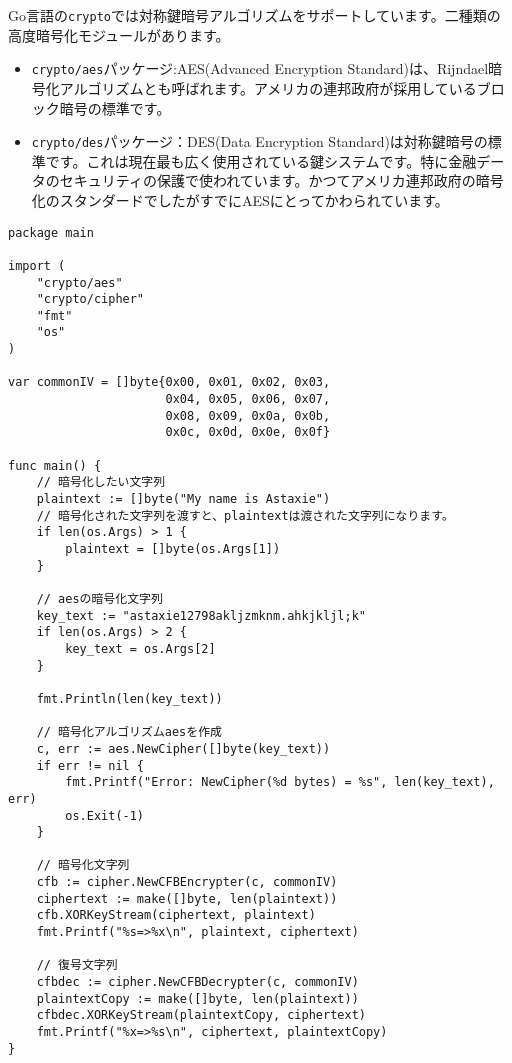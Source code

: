 Go言語の\texttt{crypto}では対称鍵暗号アルゴリズムをサポートしています。二種類の高度暗号化モジュールがあります。

\begin{itemize}
  \item \texttt{crypto/aes}パッケージ:AES(Advanced Encryption Standard)は、Rijndael暗号化アルゴリズムとも呼ばれます。アメリカの連邦政府が採用しているブロック暗号の標準です。
  \item \texttt{crypto/des}パッケージ：DES(Data Encryption Standard)は対称鍵暗号の標準です。これは現在最も広く使用されている鍵システムです。特に金融データのセキュリティの保護で使われています。かつてアメリカ連邦政府の暗号化のスタンダードでしたがすでにAESにとってかわられています。
\end{itemize}

\begin{lstlisting}[numbers=none]
package main

import (
    "crypto/aes"
    "crypto/cipher"
    "fmt"
    "os"
)

var commonIV = []byte{0x00, 0x01, 0x02, 0x03,
                      0x04, 0x05, 0x06, 0x07,
                      0x08, 0x09, 0x0a, 0x0b,
                      0x0c, 0x0d, 0x0e, 0x0f}

func main() {
    // 暗号化したい文字列
    plaintext := []byte("My name is Astaxie")
    // 暗号化された文字列を渡すと、plaintextは渡された文字列になります。
    if len(os.Args) > 1 {
        plaintext = []byte(os.Args[1])
    }

    // aesの暗号化文字列
    key_text := "astaxie12798akljzmknm.ahkjkljl;k"
    if len(os.Args) > 2 {
        key_text = os.Args[2]
    }

    fmt.Println(len(key_text))

    // 暗号化アルゴリズムaesを作成
    c, err := aes.NewCipher([]byte(key_text))
    if err != nil {
        fmt.Printf("Error: NewCipher(%d bytes) = %s", len(key_text), err)
        os.Exit(-1)
    }

    // 暗号化文字列
    cfb := cipher.NewCFBEncrypter(c, commonIV)
    ciphertext := make([]byte, len(plaintext))
    cfb.XORKeyStream(ciphertext, plaintext)
    fmt.Printf("%s=>%x\n", plaintext, ciphertext)

    // 復号文字列
    cfbdec := cipher.NewCFBDecrypter(c, commonIV)
    plaintextCopy := make([]byte, len(plaintext))
    cfbdec.XORKeyStream(plaintextCopy, ciphertext)
    fmt.Printf("%x=>%s\n", ciphertext, plaintextCopy)
}
\end{lstlisting}

